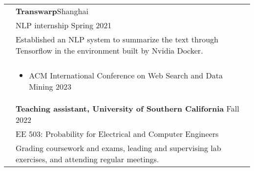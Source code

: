 \documentclass[letterpaper, 11pt]{article}
\begin{document}
\begin{longtable}{p{1.3in}p{4.8in}}
& {\textbf{Transwarp}}\hfill Shanghai\\
& NLP internship \hfill Spring 2021 \\
& Established an NLP system to summarize the text through Tensorflow in the environment built by Nvidia Docker.\\
& \\

\newline
{\color{black}{Professional service}}
&  \begin{itemize}[leftmargin=10pt, itemsep=-5pt, topsep=0pt]
    \item ACM International Conference on Web Search and Data Mining \hfill 2023
  \end{itemize}\\ 


{\color{black}{Teaching experience}} 
& \textbf{Teaching assistant, University of Southern California} \hfill Fall 2022 \\
& EE 503: Probability for Electrical and Computer Engineers \\
& Grading coursework and exams, leading and supervising lab exercises, and attending regular meetings. \\










\end{longtable}
\end{document}
